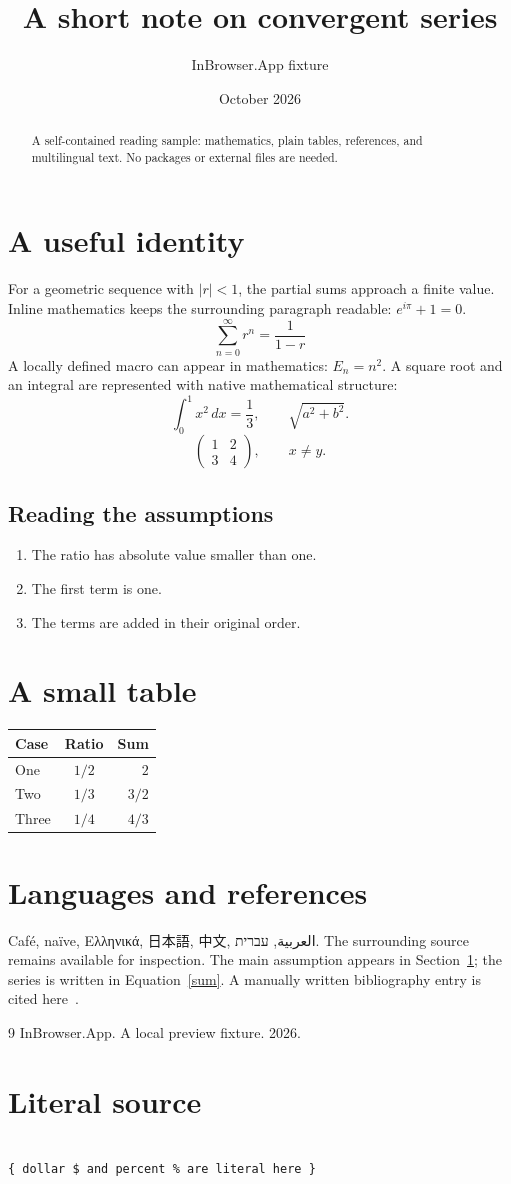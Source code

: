 \documentclass{article}
\title{A short note on convergent series}
\author{InBrowser.App fixture}
\date{October 2026}
\newcommand{\energy}[1]{E_{#1}}
\begin{document}
\maketitle
\begin{abstract}
A self-contained reading sample: mathematics, plain tables, references, and multilingual text. No packages or external files are needed.
\end{abstract}
\tableofcontents
\section{A useful identity}\label{identity}
For a geometric sequence with $|r|<1$, the partial sums approach a finite value. Inline mathematics keeps the surrounding paragraph readable: $e^{i\pi}+1=0$.
\begin{equation}\label{sum}
\sum_{n=0}^{\infty} r^n = \frac{1}{1-r}
\end{equation}
A locally defined macro can appear in mathematics: $\energy{n}=n^2$. A square root and an integral are represented with native mathematical structure:
\[
\int_0^1 x^2\,dx = \frac{1}{3}, \qquad \sqrt{a^2+b^2}.
\]
\[
\begin{pmatrix}1 & 2\\3 & 4\end{pmatrix}, \qquad x \not= y.
\]
\subsection{Reading the assumptions}
\begin{enumerate}
\item The ratio has absolute value smaller than one.
\item The first term is one.
\item The terms are added in their original order.
\end{enumerate}
\section{A small table}
\begin{tabular}{lcr}
Case & Ratio & Sum \\\hline
One & $1/2$ & $2$ \\
Two & $1/3$ & $3/2$ \\
Three & $1/4$ & $4/3$
\end{tabular}
\section{Languages and references}
Café, naïve, Ελληνικά, 日本語, 中文, العربية, עברית. The surrounding source remains available for inspection.
The main assumption appears in Section~\ref{identity}; the series is written in Equation~\eqref{sum}. A manually written bibliography entry is cited here~\cite{owned}.
\begin{thebibliography}{9}
 InBrowser.App. A local preview fixture. 2026.
\end{thebibliography}
\section{Literal source}
\begin{verbatim}

{ dollar $ and percent % are literal here }
\end{verbatim}
\end{document}
